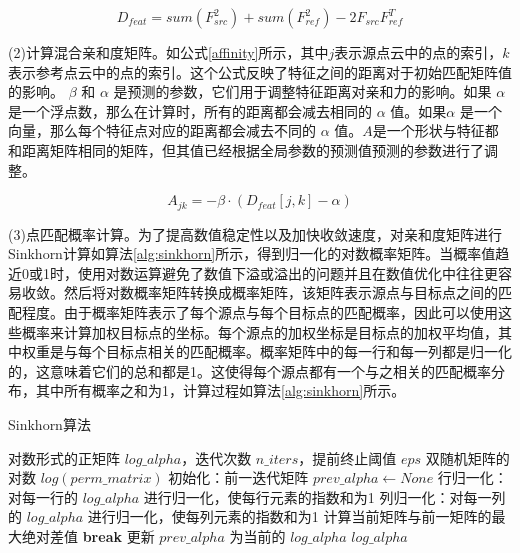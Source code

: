 \begin{equation}
	\label{dist3}
	D_{feat} = sum(F_{src}^2) +sum( F_{ref}^2) - 2 F_{src}F_{ref}^T
\end{equation}
\par
(2)计算混合亲和度矩阵。如公式\eqref{affinity}所示，其中$ j $表示源点云中的点的索引，$k $表示参考点云中的点的索引。这个公式反映了特征之间的距离对于初始匹配矩阵值的影响。 $\beta$ 和 $\alpha$ 是预测的参数，它们用于调整特征距离对亲和力的影响。如果 $\alpha$ 是一个浮点数，那么在计算时，所有的距离都会减去相同的 $\alpha$ 值。如果$\alpha$ 是一个向量，那么每个特征点对应的距离都会减去不同的 $\alpha$ 值。$A$是一个形状与特征都和距离矩阵相同的矩阵，但其值已经根据全局参数的预测值预测的参数进行了调整。

\begin{equation}
	\label{affinity}
	A_{jk} = -\beta \cdot (D_{feat}[j,k] - \alpha)
\end{equation}
\par
(3)点匹配概率计算。为了提高数值稳定性以及加快收敛速度，对亲和度矩阵进行Sinkhorn计算\cite{cuturi2013sinkhorn}如算法\ref{alg:sinkhorn}所示，得到归一化的对数概率矩阵。当概率值趋近0或1时，使用对数运算避免了数值下溢或溢出的问题并且在数值优化中往往更容易收敛。然后将对数概率矩阵转换成概率矩阵，该矩阵表示源点与目标点之间的匹配程度。由于概率矩阵表示了每个源点与每个目标点的匹配概率，因此可以使用这些概率来计算加权目标点的坐标。每个源点的加权坐标是目标点的加权平均值，其中权重是与每个目标点相关的匹配概率。概率矩阵中的每一行和每一列都是归一化的，这意味着它们的总和都是1。这使得每个源点都有一个与之相关的匹配概率分布，其中所有概率之和为1，计算过程如算法\ref{alg:sinkhorn}所示。
\begin{algorithm}[htbp]
	\caption{Sinkhorn算法}\label{alg:sinkhorn}
	\begin{algorithmic}[1]
	\Require 对数形式的正矩阵 $log\_alpha$，迭代次数 $n\_iters$，提前终止阈值 $eps$
	\Ensure 双随机矩阵的对数 $log(perm\_matrix)$
	\State 初始化：前一迭代矩阵 $prev\_alpha \leftarrow None$
		\State 行归一化：对每一行的 $log\_alpha$ 进行归一化，使每行元素的指数和为1
		\State 列归一化：对每一列的 $log\_alpha$ 进行归一化，使每列元素的指数和为1
			\State 计算当前矩阵与前一矩阵的最大绝对差值
				\State \textbf{break}
			\EndIf
		\EndIf
		\State 更新 $prev\_alpha$ 为当前的 $log\_alpha$
	\EndFor
	\State \Return $log\_alpha$
	\end{algorithmic}
\end{algorithm}
\par

